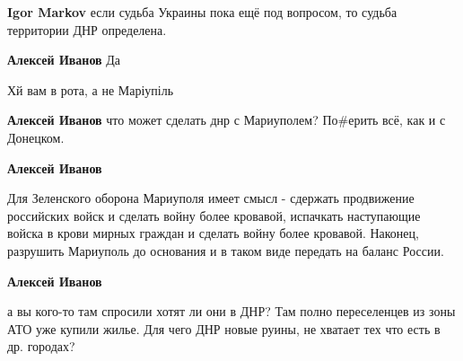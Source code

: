 \begin{itemize}
\begin{itemize}
\textbf{Igor Markov} если судьба Украины пока ещё под вопросом, то судьба территории ДНР определена.

\textbf{Алексей Иванов} Да

Хй вам в рота, а не Маріупіль

\textbf{Алексей Иванов} что может сделать днр с Мариуполем? По\#ерить всё, как и с Донецком.

\textbf{Алексей Иванов} 

Для Зеленского оборона Мариуполя имеет смысл - сдержать продвижение российских
войск и сделать войну более кровавой, испачкать наступающие войска в крови
мирных граждан и сделать войну более кровавой. Наконец, разрушить Мариуполь до
основания и в таком виде передать на баланс России.

\textbf{Алексей Иванов} 

а вы кого-то там спросили хотят ли они в ДНР? Там полно переселенцев из зоны
АТО уже купили жилье. Для чего ДНР новые руины, не хватает тех что есть в др.
городах?

\end{itemize} %

\end{itemize} %
